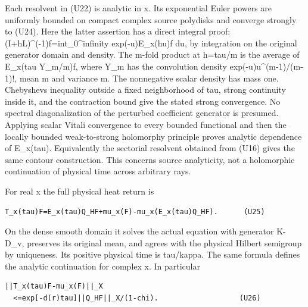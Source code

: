 \documentclass[11pt,a4paper]{article}
\renewcommand{\[}{\begingroup\small\originaldisplaystart}
\renewcommand{\]}{\originaldisplayend\endgroup}
\begin{document}
Each resolvent in (U22) is analytic in x. Its exponential Euler powers
are uniformly bounded on compact complex source polydisks and converge
strongly to (U24). Here the latter assertion has a direct integral
proof:
{(\allowbreak{}I\allowbreak{}+\allowbreak{}h\allowbreak{}L\allowbreak{})\allowbreak{}\textasciicircum{}\allowbreak{}(\allowbreak{}-\allowbreak{}1\allowbreak{})\allowbreak{}f\allowbreak{}=\allowbreak{}i\allowbreak{}n\allowbreak{}t\allowbreak{}\_\allowbreak{}0\allowbreak{}\textasciicircum{}\allowbreak{}i\allowbreak{}n\allowbreak{}f\allowbreak{}i\allowbreak{}n\allowbreak{}i\allowbreak{}t\allowbreak{}y\allowbreak{}}
exp(-u)E\_x(hu)f du, by integration on the original generator domain and
density. The m-fold product at h=tau/m is the average of E\_x(tau
Y\_m/m)f, where Y\_m has the convolution density
{e\allowbreak{}x\allowbreak{}p\allowbreak{}(\allowbreak{}-\allowbreak{}u\allowbreak{})\allowbreak{}u\allowbreak{}\textasciicircum{}\allowbreak{}(\allowbreak{}m\allowbreak{}-\allowbreak{}1\allowbreak{})\allowbreak{}/\allowbreak{}(\allowbreak{}m\allowbreak{}-\allowbreak{}1\allowbreak{})\allowbreak{}!\allowbreak{},\allowbreak{}}
mean m and variance m. The nonnegative scalar density has mass one.
Chebyshev\textquotesingle s inequality outside a fixed neighborhood of
tau, strong continuity inside it, and the contraction bound give the
stated strong convergence. No spectral diagonalization of the perturbed
coefficient generator is presumed. Applying scalar Vitali convergence to
every bounded functional and then the locally bounded weak-to-strong
holomorphy principle proves analytic dependence of E\_x(tau).
Equivalently the sectorial resolvent obtained from (U16) gives the same
contour construction. This concerns source analyticity, not a
holomorphic continuation of physical time across arbitrary rays.

For real x the full physical heat return is

\begin{verbatim}
T_x(tau)F=E_x(tau)Q_HF+mu_x(F)-mu_x(E_x(tau)Q_HF).      (U25)
\end{verbatim}

On the dense smooth domain it solves the actual equation with generator
K-D\_v, preserves its original mean, and agrees with the physical
Hilbert semigroup by uniqueness. Its positive physical time is
tau/kappa. The same formula defines the analytic continuation for
complex x. In particular

\begin{verbatim}
||T_x(tau)F-mu_x(F)||_X
  <=exp[-d(r)tau]||Q_HF||_X/(1-chi).                   (U26)
\end{verbatim}
\end{document}

